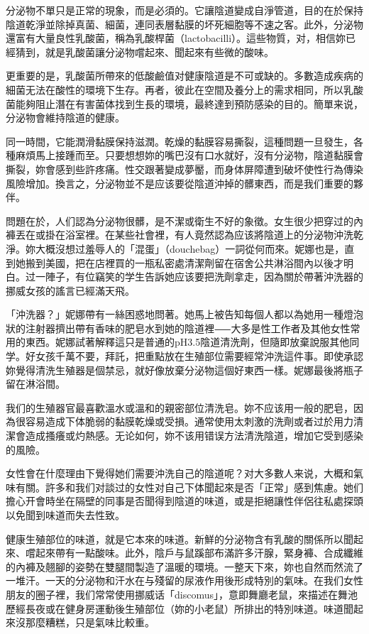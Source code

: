\documentclass[12pt,UTF8]{ctexbook}
\begin{document}
分泌物不單只是正常的現象，而是必須的。它讓陰道變成自淨管道，目的在於保持陰道乾淨並除掉真菌、細菌，連同表層黏膜的坏死細胞等不速之客。此外，分泌物還富有大量良性乳酸菌，稱為乳酸桿菌（lactobacilli）。這些物質，对，相信妳已經猜到，就是乳酸菌讓分泌物嚐起來、聞起來有些微的酸味。

更重要的是，乳酸菌所帶來的低酸鹼值对健康陰道是不可或缺的。多數造成疾病的細菌无法在酸性的環境下生存。再者，彼此在空間及養分上的需求相同，所以乳酸菌能夠阻止潛在有害菌体找到生長的環境，最終達到預防感染的目的。簡單来说，分泌物會維持陰道的健康。

同一時間，它能潤滑黏膜保持滋潤。乾燥的黏膜容易撕裂，這種問題一旦發生，各種麻煩馬上接踵而至。只要想想妳的嘴巴沒有口水就好，沒有分泌物，陰道黏膜會撕裂，妳會感到些許疼痛。性交跟著變成夢靨，而身体屏障遭到破坏使性行為傳染風險增加。換言之，分泌物並不是应该要從陰道沖掉的髒東西，而是我们重要的夥伴。

問題在於，人们認為分泌物很髒，是不潔或衛生不好的象徵。女生很少把穿过的內褲丟在或掛在浴室裡。在某些社會裡，有人竟然認為应该將陰道上的分泌物沖洗乾淨。妳大概沒想过羞辱人的「混蛋」（douchebag）一詞從何而來。妮娜也是，直到她搬到美國，把在店裡買的一瓶私密處清潔劑留在宿舍公共淋浴間內以後才明白。过一陣子，有位竊笑的学生告訴她应该要把洗劑拿走，因為關於帶著沖洗器的挪威女孩的謠言已經滿天飛。

「沖洗器？」妮娜帶有一絲困惑地問著。她馬上被告知每個人都以為她用一種燈泡狀的注射器擠出帶有香味的肥皂水到她的陰道裡⸺大多是性工作者及其他女性常用的東西。妮娜試著解釋這只是普通的pH3.5陰道清洗劑，但隨即放棄說服其他同学。好女孩千萬不要，拜託，把重點放在生殖部位需要經常沖洗這件事。即使承認妳覺得清洗生殖器是個禁忌，就好像放棄分泌物這個好東西一樣。妮娜最後將瓶子留在淋浴間。

我们的生殖器官最喜歡溫水或溫和的親密部位清洗皂。妳不应该用一般的肥皂，因為很容易造成下体脆弱的黏膜乾燥或受損。通常使用太刺激的洗劑或者过於用力清潔會造成搔癢或灼熱感。无论如何，妳不该用错误方法清洗陰道，增加它受到感染的風險。

女性會在什麼理由下覺得她们需要沖洗自己的陰道呢？对大多數人来说，大概和氣味有關。許多和我们对談过的女性对自己下体聞起來是否「正常」感到焦慮。她们擔心开會時坐在隔壁的同事是否聞得到陰道的味道，或是拒絕讓性伴侶往私處探頭以免聞到味道而失去性致。

健康生殖部位的味道，就是它本來的味道。新鮮的分泌物含有乳酸的關係所以聞起來、嚐起來帶有一點酸味。此外，陰戶与鼠蹊部布滿許多汗腺，緊身褲、合成纖維的內褲及翹腳的姿勢在雙腿間製造了溫暖的環境。一整天下來，妳也自然而然流了一堆汗。一天的分泌物和汗水在与殘留的尿液作用後形成特別的氣味。在我们女性朋友的圈子裡，我们常常使用挪威话「discomus」，意即舞廳老鼠，來描述在舞池歷經長夜或在健身房運動後生殖部位（妳的小老鼠）所排出的特別味道。味道聞起來沒那麼糟糕，只是氣味比較重。
\end{document}
